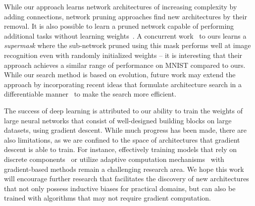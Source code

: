 While our approach learns network architectures of increasing complexity by adding connections, network pruning approaches find new architectures by their removal. It is also possible to learn  a pruned network capable of performing additional tasks without learning weights~\cite{mallya2018piggyback}. A concurrent work~\cite{zhou2019deconstructing} to ours learns a \textit{supermask} where the sub-network pruned using this mask performs well at image recognition even with randomly initialized weights -- it is interesting that their approach achieves a similar range of performance on MNIST compared to ours. While our search method is based on evolution, future work may extend the approach by incorporating recent ideas that formulate architecture search in a differentiable manner~\cite{liu2018darts} to make the search more efficient.

The success of deep learning is attributed to our ability to train the weights of large neural networks that consist of well-designed building blocks on large datasets, using gradient descent. While much progress has been made, there are also limitations, as we are confined to the space of architectures that gradient descent is able to train. For instance, effectively training models that rely on discrete components~\cite{jang2016categorical,graves2014neural} or utilize adaptive computation mechanisms~\cite{graves2016adaptive} with gradient-based methods remain a challenging research area. We hope this work will encourage further research that facilitates the discovery of new architectures that not only possess inductive biases for practical domains, but can also be trained with algorithms that may not require gradient computation.

